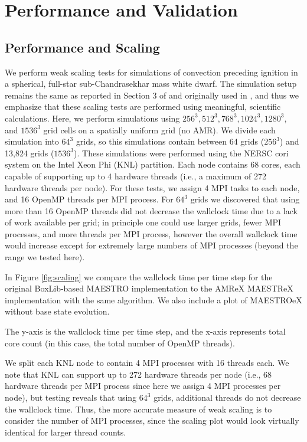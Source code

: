 \section{Performance and Validation}

\subsection{Performance and Scaling}
We perform weak scaling tests for simulations of convection preceding ignition in a spherical, full-star sub-Chandrasekhar mass white dwarf.
The simulation setup remains the same as reported in Section 3 of \cite{MAESTRO_AMR} and originally used in \cite{MAESTRO_convection}, and thus we emphasize that these scaling tests are performed using meaningful, scientific calculations.
Here, we perform simulations using $256^3, 512^3, 768^3, 1024^3, 1280^3$, and $1536^3$ grid cells on a spatially uniform grid (no AMR).
We divide each simulation into $64^3$ grids, so this simulations contain between 64 grids ($256^3$) and 13,824 grids ($1536^3$).
These simulations were performed using the NERSC cori system on the Intel Xeon Phi (KNL) partition.
Each node contains 68 cores, each capable of supporting up to 4 hardware threads (i.e., a maximum of 272 hardware threads per node).
For these tests, we assign 4 MPI tasks to each node, and 16 OpenMP threads per MPI process.
For $64^3$ grids we discovered that using more than 16 OpenMP threads did not decrease the wallclock time due to a lack of work available per grid; in principle one could use larger grids, fewer MPI processes, and more threads per MPI process, however the overall wallclock time would increase except for extremely large numbers of MPI processes (beyond the range we tested here).


In Figure \ref{fig:scaling} we compare the wallclock time per time step for the original BoxLib-based MAESTRO implementation to the AMReX MAESTReX implementation with the same algorithm.
We also include a plot of MAESTROeX without base state evolution.





The y-axis is the wallclock time per time step, and the x-axis represents total core count (in this case, the total number of OpenMP threads).

We split each KNL node to contain 4 MPI processes with 16 threads each.  We note that KNL can support up to 272 hardware threads per node (i.e., 68 hardware threads per MPI process since here we assign 4 MPI processes per node), but testing reveals that using $64^3$ grids, additional threads do not decrease the wallclock time.  Thus, the more accurate measure of weak scaling is to consider the number of MPI processes, since the scaling plot would look virtually identical for larger thread counts.


